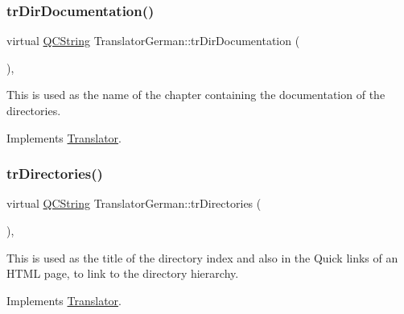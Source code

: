 \mbox{\label{class_translator_german_a7e5726b5c6331a54de31316e61ebf9fe}} 
\subsubsection{\texorpdfstring{trDirDocumentation()}{trDirDocumentation()}}
{\footnotesize\ttfamily virtual \mbox{\hyperlink{class_q_c_string}{Q\+C\+String}} Translator\+German\+::tr\+Dir\+Documentation (\begin{DoxyParamCaption}{ }\end{DoxyParamCaption})\hspace{0.3cm}{\ttfamily [inline]}, {\ttfamily [virtual]}}

This is used as the name of the chapter containing the documentation of the directories. 

Implements \mbox{\hyperlink{class_translator}{Translator}}.

\mbox{\label{class_translator_german_a42df8de10bf821b0372b4061919c73fc}} 
\subsubsection{\texorpdfstring{trDirectories()}{trDirectories()}}
{\footnotesize\ttfamily virtual \mbox{\hyperlink{class_q_c_string}{Q\+C\+String}} Translator\+German\+::tr\+Directories (\begin{DoxyParamCaption}{ }\end{DoxyParamCaption})\hspace{0.3cm}{\ttfamily [inline]}, {\ttfamily [virtual]}}

This is used as the title of the directory index and also in the Quick links of an H\+T\+ML page, to link to the directory hierarchy. 

Implements \mbox{\hyperlink{class_translator}{Translator}}.

\mbox{\label{class_translator_german_a2d33bc79fb65d698807ea46532d50551}} 
